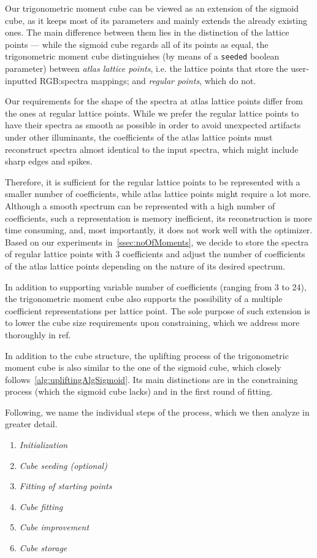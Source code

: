 Our trigonometric moment cube can be viewed as an extension of the sigmoid cube, as it keeps most of its parameters and mainly extends the already existing ones. The main difference between them lies in the distinction of the lattice points --- while the sigmoid cube regards all of its points as equal, the trigonometric moment cube distinguishes (by means of a \texttt{seeded} boolean parameter) between \emph{atlas lattice points}, i.e. the lattice points that store the user-inputted RGB:spectra mappings; and \emph{regular points}, which do not.

Our requirements for the shape of the spectra at atlas lattice points differ from the ones at regular lattice points. While we prefer the regular lattice points to have their spectra as smooth as possible in order to avoid unexpected artifacts under other illuminants, the coefficients of the atlas lattice points must reconstruct spectra almost identical to the input spectra, which might include sharp edges and spikes.

Therefore, it is sufficient for the regular lattice points to be represented with a smaller number of coefficients, while atlas lattice points might require a lot more. Although a smooth spectrum can be represented with a high number of coefficients, such a representation is memory inefficient, its reconstruction is more time consuming, and, most importantly, it does not work well with the optimizer. Based on our experiments in~\cref{ssec:noOfMoments}, we decide to store the spectra of regular lattice points with 3 coefficients and adjust the number of coefficients of the atlas lattice points depending on the nature of its desired spectrum.

In addition to supporting variable number of coefficients (ranging from 3 to 24), the trigonometric moment cube also supports the possibility of a multiple coefficient representations per lattice point. The sole purpose of such extension is to lower the cube size requirements upon constraining, which we address more thoroughly in ref.

In addition to the cube structure, the uplifting process of the trigonometric moment cube is also similar to the one of the sigmoid cube, which closely follows~\cref{alg:upliftingAlgSigmoid}. Its main distinctions are in the constraining process (which the sigmoid cube lacks) and in the first round of fitting.

Following, we name the individual steps of the process, which we then analyze in greater detail.
\begin{enumerate}
	\item \emph{Initialization}
	\item \emph{Cube seeding (optional)}
	\item \emph{Fitting of starting points}
	\item \emph{Cube fitting}
	\item \emph{Cube improvement}
	\item \emph{Cube storage}
\end{enumerate}


